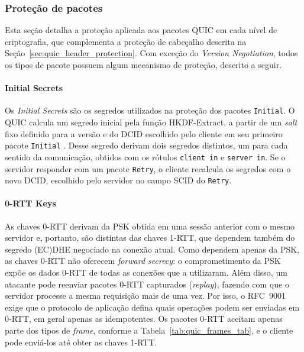 \subsubsection{Proteção de pacotes}
\label{sec:quic_packet_protection}

Esta seção detalha a proteção aplicada aos pacotes QUIC em cada nível de criptografia, que complementa a proteção de cabeçalho descrita na Seção~\ref{sec:quic_header_protection}. Com exceção do \textit{Version Negotiation}, todos os tipos de pacote possuem algum mecanismo de proteção, descrito a seguir.

\paragraph{Initial Secrets}

Os \textit{Initial Secrets} são os segredos utilizados na proteção dos pacotes \texttt{Initial}. O QUIC calcula um segredo inicial pela função HKDF-Extract, a partir de um \textit{salt} fixo definido para a versão e do DCID escolhido pelo cliente em seu primeiro pacote \texttt{Initial} \citep{rfc9001}. Desse segredo derivam dois segredos distintos, um para cada sentido da comunicação, obtidos com os rótulos \texttt{client in} e \texttt{server in}. Se o servidor responder com um pacote \texttt{Retry}, o cliente recalcula os segredos com o novo DCID, escolhido pelo servidor no campo SCID do \texttt{Retry}.

\paragraph{0-RTT Keys}

As chaves 0-RTT derivam da PSK obtida em uma sessão anterior com o mesmo servidor e, portanto, são distintas das chaves 1-RTT, que dependem também do segredo (EC)DHE negociado na conexão atual. Como dependem apenas da PSK, as chaves 0-RTT não oferecem \textit{forward secrecy}: o comprometimento da PSK expõe os dados 0-RTT de todas as conexões que a utilizaram. Além disso, um atacante pode reenviar pacotes 0-RTT capturados (\textit{replay}), fazendo com que o servidor processe a mesma requisição mais de uma vez. Por isso, o RFC~9001 \citep{rfc9001} exige que o protocolo de aplicação defina quais operações podem ser enviadas em 0-RTT, em geral apenas as idempotentes. Os pacotes 0-RTT aceitam apenas parte dos tipos de \textit{frame}, conforme a Tabela~\ref{tab:quic_frames_tab}, e o cliente pode enviá-los até obter as chaves 1-RTT.

